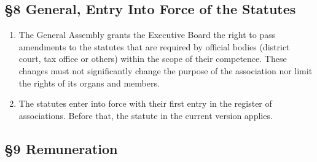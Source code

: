 \documentclass{article}
\begin{document}
\subsection{\S 8 General, Entry Into Force of the Statutes}

\begin{enumerate}
	\item The General Assembly grants the Executive Board the right to pass amendments to the statutes that are required by official bodies (district court, tax office or others) within the scope of their competence. 
	These changes must not significantly change the purpose of the association nor limit the rights of its organs and members.
	\item The statutes enter into force with their first entry in the register of associations. 
	Before that, the statute in the current version applies.
\end{enumerate}

\subsection{\S 9 Remuneration}
\end{document}
